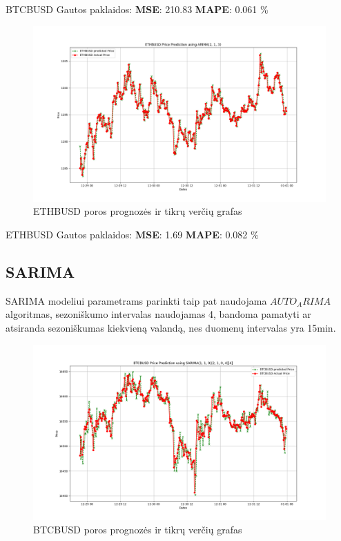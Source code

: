 \documentclass{VUMIFInfKursinis}
\begin{document}
BTCBUSD Gautos paklaidos:
\textbf{MSE}: 210.83
\textbf{MAPE}: 0.061 \%


\begin{figure}[H]
  \centering
  \includegraphics[scale=0.35]{img/ETHBUSD_15m_dec_final.png}
  \caption{ETHBUSD poros prognozės ir tikrų verčių grafas}
  \label{fig:ethbusd_results}
\end{figure}

ETHBUSD Gautos paklaidos:
\textbf{MSE}: 1.69
\textbf{MAPE}: 0.082 \%

\subsection{SARIMA}
SARIMA modeliui parametrams parinkti taip pat naudojama $AUTO_ARIMA$ algoritmas, sezoniškumo intervalas naudojamas 4, bandoma pamatyti ar atsiranda
sezoniškumas kiekvieną valandą, nes duomenų intervalas yra 15min.

\begin{figure}[H]
  \centering
  \includegraphics[scale=0.35]{img/btcbusd_sarim_full.png}
  \caption{BTCBUSD poros prognozės ir tikrų verčių grafas}
  \label{fig:btcbusd_sarima_results}
\end{figure}
\end{document}
